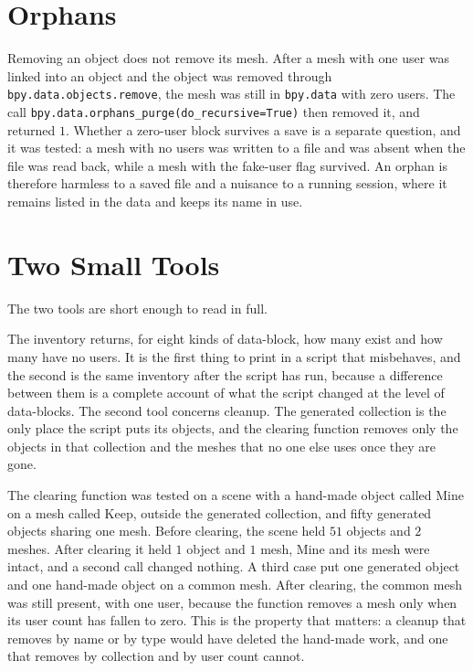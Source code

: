 \section{Orphans}

Removing an object does not remove its mesh. After a mesh with one user was linked into an object and the object was removed through \texttt{bpy.data.objects.remove}, the mesh was still in \texttt{bpy.data} with zero users. The call \texttt{bpy.data.orphans\_purge(do\_recursive=True)} then removed it, and returned $1$. Whether a zero-user block survives a save is a separate question, and it was tested: a mesh with no users was written to a file and was absent when the file was read back, while a mesh with the fake-user flag survived. An orphan is therefore harmless to a saved file and a nuisance to a running session, where it remains listed in the data and keeps its name in use.

\section{Two Small Tools}

The two tools are short enough to read in full.



The inventory returns, for eight kinds of data-block, how many exist and how many have no users. It is the first thing to print in a script that misbehaves, and the second is the same inventory after the script has run, because a difference between them is a complete account of what the script changed at the level of data-blocks. The second tool concerns cleanup. The generated collection is the only place the script puts its objects, and the clearing function removes only the objects in that collection and the meshes that no one else uses once they are gone.

The clearing function was tested on a scene with a hand-made object called Mine on a mesh called Keep, outside the generated collection, and fifty generated objects sharing one mesh. Before clearing, the scene held $51$ objects and $2$ meshes. After clearing it held $1$ object and $1$ mesh, Mine and its mesh were intact, and a second call changed nothing. A third case put one generated object and one hand-made object on a common mesh. After clearing, the common mesh was still present, with one user, because the function removes a mesh only when its user count has fallen to zero. This is the property that matters: a cleanup that removes by name or by type would have deleted the hand-made work, and one that removes by collection and by user count cannot.

